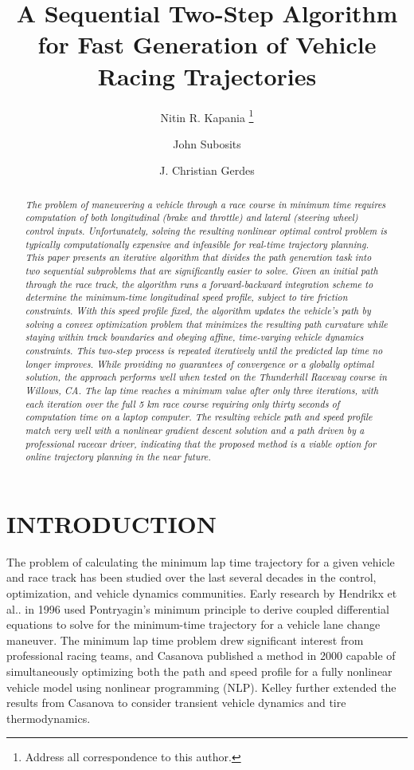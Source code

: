 \documentclass[twocolumn,10pt, final]{asme2e}
\title{A Sequential Two-Step Algorithm for Fast Generation of Vehicle Racing Trajectories}
\author{Nitin R. Kapania \thanks{Address all correspondence to this author.}
    \affiliation{
	School of Mechanical Engineering\\
	Stanford University\\
	Stanford, CA 94305\\
	nkapania@stanford.edu
    }	
}
\author{John Subosits
    \affiliation{School of Mechanical Engineering\\
	Stanford University\\
	Stanford, CA 94305\\
	subosits@stanford.edu
    }
}
\author{J. Christian Gerdes
    \affiliation{School of Mechanical Engineering\\
	Stanford University\\
	Stanford, CA 94305\\
	gerdes@stanford.edu
    }
}
\begin{document}
\maketitle    

\begin{abstract}
{\it The problem of maneuvering a vehicle through a race course in minimum time requires computation of 
 both longitudinal (brake and throttle) and lateral (steering wheel) control inputs.    
 Unfortunately, solving the resulting nonlinear optimal control problem is typically computationally expensive and infeasible for real-time trajectory planning.
 This paper presents an iterative algorithm that divides the path generation
 task into two sequential subproblems that are significantly easier to solve. Given an initial path through the race track, the algorithm
 runs a forward-backward integration scheme to determine the minimum-time longitudinal speed profile, subject to
 tire friction constraints. With this speed profile fixed, the algorithm updates the vehicle's path by solving a convex optimization problem 
 that minimizes the resulting path curvature while staying within track boundaries and obeying affine, time-varying vehicle dynamics constraints.
 This two-step process is repeated iteratively until the
 predicted lap time no longer improves. While providing no guarantees of convergence or a globally optimal solution, 
 the approach performs well when tested on the Thunderhill Raceway
 course in Willows, CA. The lap time reaches a minimum value after only three iterations, with each iteration over the full 5 km race course requiring
 only thirty seconds of computation time on a laptop computer. The resulting vehicle path and speed profile match very well with a nonlinear gradient
 descent solution and a path driven by a professional racecar driver, indicating that the proposed method is a viable option for online trajectory
 planning in the near future.}
\end{abstract}

\section*{INTRODUCTION}

The problem of calculating the minimum lap time trajectory for a given vehicle and race track has been studied over the last several decades
in the control, optimization, and vehicle dynamics communities.  Early research by Hendrikx et al.. \cite{hendrikx} in 1996 used 
 Pontryagin's minimum principle to derive coupled differential equations to solve for the minimum-time trajectory
for a vehicle lane change maneuver. The minimum lap time problem drew significant interest from professional racing teams, and
Casanova \cite{casanova} published a method in 2000 capable of simultaneously optimizing both the path and speed profile
for a fully nonlinear vehicle model using nonlinear programming (NLP). Kelley \cite{kelly} further extended the results from Casanova to 
consider transient vehicle dynamics and tire thermodynamics. 
\end{document}
